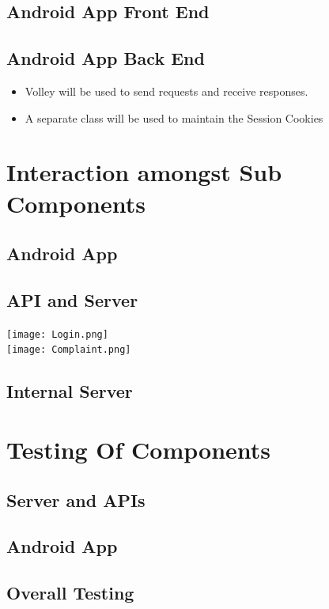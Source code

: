 \documentclass{article}
\begin{document}
\begin{enumerate}
					\end{enumerate}
			\subsection{Android App Front End}
			\subsection{Android App Back End}
			\begin{itemize}
			\item Volley will be used to send requests and receive responses.
			\item A separate class will be used to maintain the Session Cookies
			\end{itemize}
	\section{Interaction amongst Sub Components}
			\subsection{Android App}
			\subsection{API and Server}
				\texttt{[image: Login.png]} \\
				\texttt{[image: Complaint.png]}
			\subsection{Internal Server}

	
	\section{Testing Of Components}
			\subsection{Server and APIs}
			\subsection{Android App}
			\subsection{Overall Testing}
	
\end{document}
